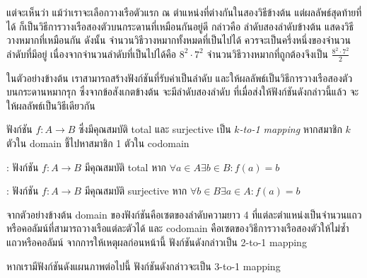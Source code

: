 \begin{example}
\begin{center}
\end{center}
%
แต่จะเห็นว่า แม้ว่าเราจะเลือกวางเรือตัวแรก ณ ตำแหน่งที่ต่างกันในสองวิธีข้างต้น แต่ผลลัพธ์สุดท้ายที่ได้ ก็เป็นวิธีการวางเรือสองตัวบนกระดานที่เหมือนกันอยู่ดี กล่าวคือ ลำดับสองลำดับข้างต้น แสดงวิธีวางหมากที่เหมือนกัน \enskip ดังนั้น จำนวนวิธีวางหมากทั้งหมดที่เป็นไปได้ ควรจะเป็นครึ่งหนึ่งของจำนวนลำดับที่มีอยู่ \enskip เนื่องจากจำนวนลำดับที่เป็นไปได้คือ $8^2\cdot 7^2$ จำนวนวิธีวางหมากที่ถูกต้องจึงเป็น $\frac{8^2\cdot 7^2}{2}$
\end{example}

ในตัวอย่างข้างต้น เราสามารถสร้างฟังก์ชันที่รับค่าเป็นลำดับ และให้ผลลัพธ์เป็นวิธีการวางเรือสองตัวบนกระดานหมากรุก ซึ่งจากข้อสังเกตข้างต้น จะมีลำดับสองลำดับ ที่เมื่อส่งให้ฟังก์ชันดังกล่าวนี้แล้ว จะให้ผลลัพธ์เป็นวิธีเดียวกัน

\begin{definition}
ฟังก์ชัน $f:A\to B$ ซึ่งมีคุณสมบัติ total และ surjective เป็น \emph{$k$-to-1 mapping} หากสมาชิก $k$ ตัวใน domain ชี้ไปหาสมาชิก 1 ตัวใน codomain
\end{definition}

: ฟังก์ชัน $f:A\to B$ มีคุณสมบัติ total หาก $\forall a\in A\exists b\in B: f(a)=b$

: ฟังก์ชัน $f:A\to B$ มีคุณสมบัติ surjective หาก $\forall b\in B\exists a\in A: f(a)=b$

จากตัวอย่างข้างต้น domain ของฟังก์ชันคือเซตของลำดับความยาว 4 ที่แต่ละตำแหน่งเป็นจำนวนแถวหรือคอลัมน์ที่สามารถวางเรือแต่ละตัวได้ และ codomain คือเซตของวิธีการวางเรือสองตัวให้ไม่ซ้ำแถวหรือคอลัมน์ \enskip จากการให้เหตุผลก่อนหน้านี้ ฟังก์ชันดังกล่าวเป็น 2-to-1 mapping

\begin{example}
หากเรามีฟังก์ชันดังแผนภาพต่อไปนี้ ฟังก์ชันดังกล่าวจะเป็น 3-to-1 mapping
\begin{center}
\end{center}
\end{example}


